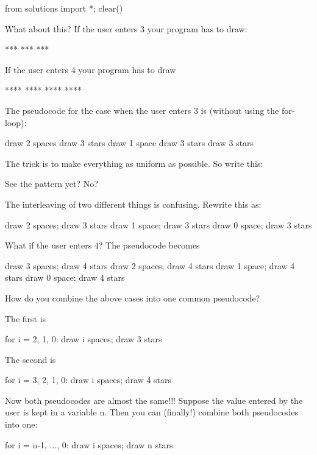 \begin{python0}
from solutions import *; clear()
\end{python0}

What about this? If the user enters 3 your program has to draw:
\begin{console}
  ***
 ***
***
\end{console}
If the user enters 4 your program has to draw
\begin{console}
   ****
  ****
 ****
****
\end{console}
The pseudocode for the case when the user enters 3 is (without using the
for-loop):
\begin{console}
draw 2 spaces
draw 3 stars
draw 1 space
draw 3 stars
draw 3 stars
\end{console}
The trick is to make everything as uniform as possible. So write this:
See the pattern yet? No?

The interleaving of two different things is confusing. Rewrite this as:
\begin{console}
draw 2 spaces; draw 3 stars
draw 1 space; draw 3 stars
draw 0 space; draw 3 stars
\end{console}
What if the user enters 4? The pseudocode becomes
\begin{console}
draw 3 spaces; draw 4 stars
draw 2 spaces; draw 4 stars
draw 1 space; draw 4 stars
draw 0 space; draw 4 stars
\end{console}
How do you combine the above cases into one common pseudocode?

The first is
\begin{console}
for i = 2, 1, 0:
        draw i spaces; draw 3 stars
\end{console}
The second is
\begin{console}
for i = 3, 2, 1, 0:
        draw i spaces; draw 4 stars
\end{console}

Now both pseudocodes are almost the same!!! Suppose the value entered by
the user is kept in a variable n. Then you can (finally!) combine both
pseudocodes into one:
\begin{console}
for i = n-1, ..., 0:
        draw i spaces; draw n stars
\end{console}


